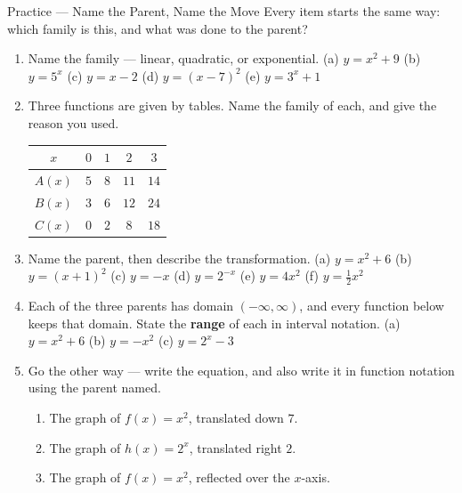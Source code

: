 \documentclass[10pt]{article}
\begin{document}

\vspace{0.15in}

\boxguard[24]
\begin{notesbox}{Practice --- Name the Parent, Name the Move}
\small
Every item starts the same way: which family is this, and what was done to the parent?

\begin{enumerate}[leftmargin=1.6em, itemsep=6pt, topsep=4pt]

\item Name the family --- linear, quadratic, or exponential.
\quad (a) $y=x^2+9$ \quad (b) $y=5^x$ \quad (c) $y=x-2$ \quad (d) $y=(x-7)^2$
\quad (e) $y=3^x+1$


\item Three functions are given by tables. Name the family of each, and give the reason you used.
\smallskip

\renewcommand{\arraystretch}{1.25}
\begin{tabular}{@{}|c|c|c|c|c|@{}}
\hline
$x$ & $0$ & $1$ & $2$ & $3$ \\ \hline
$A(x)$ & $5$ & $8$ & $11$ & $14$ \\ \hline
$B(x)$ & $3$ & $6$ & $12$ & $24$ \\ \hline
$C(x)$ & $0$ & $2$ & $8$ & $18$ \\ \hline
\end{tabular}
\smallskip


\item Name the parent, then describe the transformation.
\quad (a) $y=x^2+6$ \quad (b) $y=(x+1)^2$ \quad (c) $y=-x$ \quad (d) $y=2^{-x}$
\quad (e) $y=4x^2$ \quad (f) $y=\tfrac{1}{2}x^2$


\item Each of the three parents has domain $(-\infty,\infty)$, and every function below keeps that
domain. State the \textbf{range} of each in interval notation.
\quad (a) $y=x^2+6$ \quad (b) $y=-x^2$ \quad (c) $y=2^x-3$


\item Go the other way --- write the equation, and also write it in function notation using the
parent named.
\begin{enumerate}[label=(\alph*), leftmargin=1.6em, itemsep=3pt, topsep=3pt]
  \item The graph of $f(x)=x^2$, translated down $7$.
  \item The graph of $h(x)=2^x$, translated right $2$.
  \item The graph of $f(x)=x^2$, reflected over the $x$-axis.
\end{enumerate}


\end{enumerate}
\end{notesbox}
\end{document}
